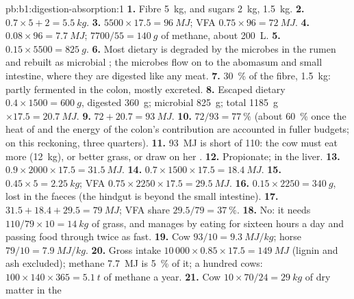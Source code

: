 \begin{solution}{pb:b1:digestion-absorption:1}
\textbf{1.} Fibre \qty{5}{kg},  and sugars \qty{2}{kg}, 
\qty{1.5}{kg}.
\textbf{2.} $0.7\times 5 + 2 = \qty{5.5}{kg}$.
\textbf{3.} $5500\times 17.5 = \qty{96}{MJ}$; VFA $0.75\times 96 =
\qty{72}{MJ}$.
\textbf{4.} $0.08\times 96 = \qty{7.7}{MJ}$; $7700/55 = \qty{140}{g}$
of methane, about \qty{200}{L}.
\textbf{5.} $0.15\times 5500 = \qty{825}{g}$.
\textbf{6.} Most dietary  is degraded by the microbes in the
rumen and rebuilt as microbial ; the microbes flow on to the
abomasum and small intestine, where they are digested like any meat.
\textbf{7.} \qty{30}{\%} of the fibre, \qty{1.5}{kg}: partly fermented
in the colon, mostly excreted.
\textbf{8.} Escaped dietary  $0.4\times 1500 = \qty{600}{g}$,
digested \qty{360}{g}; microbial \qty{825}{g}; total \qty{1185}{g}
$\times 17.5 = \qty{20.7}{MJ}$.
\textbf{9.} $72 + 20.7 = \qty{93}{MJ}$.
\textbf{10.} $72/93 = \qty{77}{\%}$ (about \qty{60}{\%} once the heat
of  and the energy of the colon's contribution are
accounted in fuller budgets; on this reckoning, three quarters).
\textbf{11.} \qty{93}{MJ} is short of \qty{110}{}: the cow must eat
more (\qty{12}{kg}), or better grass, or draw on her .
\textbf{12.} Propionate;  in the liver.
\textbf{13.} $0.9\times 2000\times 17.5 = \qty{31.5}{MJ}$.
\textbf{14.} $0.7\times 1500\times 17.5 = \qty{18.4}{MJ}$.
\textbf{15.} $0.45\times 5 = \qty{2.25}{kg}$; VFA $0.75\times 2250\times
17.5 = \qty{29.5}{MJ}$.
\textbf{16.} $0.15\times 2250 = \qty{340}{g}$, lost in the faeces (the
hindgut is beyond the small intestine).
\textbf{17.} $31.5 + 18.4 + 29.5 = \qty{79}{MJ}$; VFA share $29.5/79 =
\qty{37}{\%}$.
\textbf{18.} No: it needs $110/79\times 10 = \qty{14}{kg}$ of grass, and
manages by eating for sixteen hours a day and passing food through
twice as fast.
\textbf{19.} Cow $93/10 = \qty{9.3}{MJ/kg}$; horse $79/10 =
\qty{7.9}{MJ/kg}$.
\textbf{20.} Gross intake $10\,000\times 0.85\times 17.5 =
\qty{149}{MJ}$ (lignin and ash excluded); methane \qty{7.7}{MJ} is
\qty{5}{\%} of it; a hundred cows: $100\times 140\times 365 =
\qty{5.1}{t}$ of methane a year.
\textbf{21.} Cow $10\times 70/24 = \qty{29}{kg}$ of dry matter in the

\end{solution}
